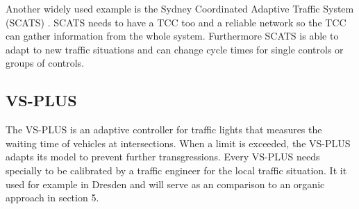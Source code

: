 Another widely used example is the Sydney Coordinated Adaptive Traffic System (SCATS) \cite{scats}. SCATS needs to have a TCC too and a reliable network so the TCC can gather information from the whole system. Furthermore SCATS is able to adapt to new traffic situations and can change cycle times for single controls or groups of controls.

\subsection{VS-PLUS}
The VS-PLUS \cite{laemmer15} is an adaptive controller for traffic lights that measures the waiting time of vehicles at intersections. When a limit is exceeded, the VS-PLUS adapts its model to prevent further transgressions. Every VS-PLUS needs specially to be calibrated by a traffic engineer for the local traffic situation. It it used for example in Dresden and will serve as an comparison to an organic approach in section 5.


